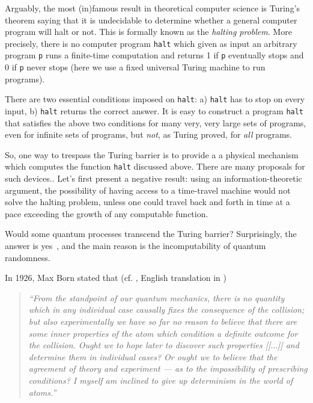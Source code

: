 \documentclass[12pt]{article}
\begin{document}
Arguably, the most (in)famous  result in theoretical computer science is  Turing's
theorem saying that it is undecidable to determine whether a
general
computer program will halt or not.   This is formally known as the \emph{%
halting problem}.  More precisely, there is no computer program {\tt halt}
which given as input an arbitrary program {\tt p} runs a finite-time computation and returns 1 if
{\tt p} eventually stops and 0 if {\tt p} never stops (here we use a fixed universal Turing machine
to run programs).

There are two essential conditions imposed on {\tt halt}: a) {\tt halt} has to stop on every input, b)
{\tt halt} returns the correct answer.
It is easy to construct a program {\tt halt} that satisfies the above two
conditions for many very, very large sets of programs, even for infinite sets of programs,
but {\it not}, as Turing proved, for {\it all} programs.



So, one way to trespass the Turing barrier is to provide a
a physical mechanism which computes the function  {\tt halt} discussed above. There are many
proposals for such devices..
Let's first present a negative result:  using an information-theoretic
argument,  the possibility of having access to a time-travel machine
 would not solve the halting problem,
unless one
could travel back and forth in time at a pace exceeding the growth of any
computable function.

Would some quantum processes transcend the Turing barrier?
Surprisingly, the answer is yes~\cite{2008-cal-svo}, and the main reason is the incomputability
of quantum randomness.


In 1926, Max Born stated that (cf. \cite[p.~866]{born-26-1}, English translation in \cite[p.~54]{wheeler-Zurek:83})

\begin{quote}
{\em  ``From the standpoint of our quantum mechanics, there is no quantity
which in any individual case causally fixes the consequence of the collision;
but also experimentally we have so far no reason to believe that there are some inner properties of the atom
which condition a definite outcome for the collision.
Ought we to hope later to discover such properties [[$\ldots$]]  and determine them in individual cases?
Or ought we to  believe that the agreement of theory and experiment --- as to the impossibility
of prescribing conditions? I myself am inclined  to give up determinism in the world of atoms.''
}
\end{quote}
\end{document}

